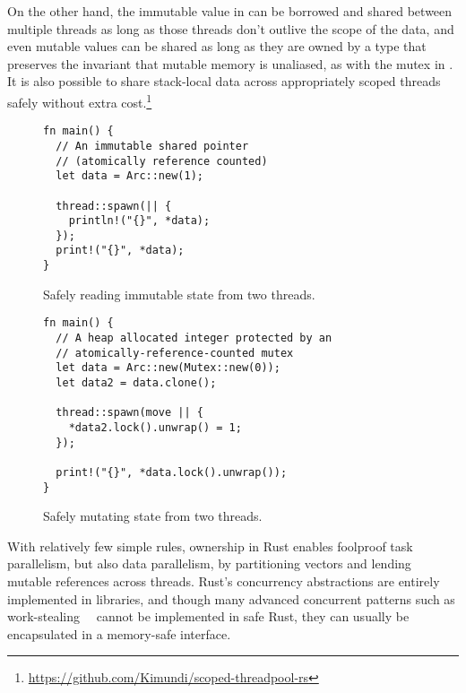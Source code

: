 On the other hand, the immutable value in  can be borrowed and shared between multiple threads as long as those threads don't outlive the scope of the data, and even mutable values can be shared as long
as they are owned by a type that preserves the invariant that mutable memory is unaliased, as with the
mutex in .
It is also possible to share stack-local data across appropriately scoped threads safely without extra
cost.\footnote{\url{https://github.com/Kimundi/scoped-threadpool-rs}}

\begin{figure}
\begin{lstlisting}
fn main() {
  // An immutable shared pointer
  // (atomically reference counted)
  let data = Arc::new(1);

  thread::spawn(|| {
    println!("{}", *data);
  });
  print!("{}", *data);
}
\end{lstlisting}
  \caption{Safely reading immutable state from two threads.}
  \label{fig:shared-concurrency}
\end{figure}

\begin{figure}
\begin{lstlisting}
fn main() {
  // A heap allocated integer protected by an
  // atomically-reference-counted mutex
  let data = Arc::new(Mutex::new(0));
  let data2 = data.clone();

  thread::spawn(move || {
    *data2.lock().unwrap() = 1;
  });

  print!("{}", *data.lock().unwrap());
}
\end{lstlisting}
  \caption{Safely mutating state from two threads.}
  \label{fig:shared-mutable-concurrency}
\end{figure}

With relatively few simple rules, ownership in Rust enables foolproof task parallelism,
but also data parallelism, by partitioning vectors and lending mutable references across threads.
Rust's concurrency abstractions are entirely implemented in libraries, and though
many advanced concurrent patterns such as work-stealing~~\cite{blumeofe:multiprogrammed-work-stealing}
cannot be implemented in safe Rust, they can usually be encapsulated in a memory-safe interface.

